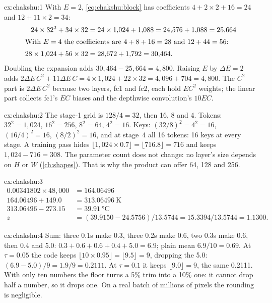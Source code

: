 
\begin{solution}{ex:chakshu:1}
With $E=2$, \cref{eq:chakshu:block} has coefficients $4+2\times2+16=24$ and $12+11\times2=34$:
\begin{align*}
24\times32^2+34\times32 &= 24\times1{,}024+1{,}088 = 24{,}576+1{,}088 = 25{,}664 \\
\intertext{With $E=4$ the coefficients are $4+8+16=28$ and $12+44=56$:}
28\times1{,}024+56\times32 &= 28{,}672+1{,}792 = 30{,}464 .
\end{align*}
Doubling the expansion adds $30{,}464-25{,}664=4{,}800$. Raising $E$ by $\Delta E=2$ adds $2\Delta E\,C^2+11\Delta E\,C
=4\times1{,}024+22\times32=4{,}096+704=4{,}800$. The $C^2$ part is $2\Delta E\,C^2$ because two layers, fc1 and fc2, each
hold $E C^2$ weights; the linear part collects fc1's $EC$ biases and the depthwise convolution's $10EC$.
\end{solution}

\begin{solution}{ex:chakshu:2}
The stage-1 grid is $128/4=32$, then 16, 8 and 4. Tokens: $32^2=1{,}024$, $16^2=256$, $8^2=64$, $4^2=16$. Keys:
$(32/8)^2=4^2=16$, $(16/4)^2=16$, $(8/2)^2=16$, and at stage~4 all 16 tokens: 16 keys at every stage. A training pass
hides $\lfloor1{,}024\times0.7\rfloor=\lfloor716.8\rfloor=716$ and keeps $1{,}024-716=308$. The parameter count does not
change: no layer's size depends on $H$ or $W$ (\cref{ch:shapes}). That is why the product can offer 64, 128 and 256.
\end{solution}

\begin{solution}{ex:chakshu:3}
\begin{align*}
0.00341802\times48{,}000 &= 164.06496\\
164.06496+149.0 &= 313.06496\ \text{K}\\
313.06496-273.15 &= 39.91\ \text{°C}\\
z &= (39.9150-24.5756)/13.5744 = 15.3394/13.5744 = 1.1300 .
\end{align*}
\end{solution}

\begin{solution}{ex:chakshu:4}
Sum: three 0.1s make 0.3, three 0.2s make 0.6, two 0.3s make 0.6, then 0.4 and 5.0:
$0.3+0.6+0.6+0.4+5.0=6.9$; plain mean $6.9/10=0.69$. At $\tau=0.05$ the code keeps
$\lfloor10\times0.95\rfloor=\lfloor9.5\rfloor=9$, dropping the 5.0: $(6.9-5.0)/9=1.9/9=0.2111$. At $\tau=0.1$ it keeps
$\lfloor9.0\rfloor=9$, the same 0.2111. With only ten numbers the floor turns a 5\% trim into a 10\% one: it cannot
drop half a number, so it drops one. On a real batch of millions of pixels the rounding is negligible.
\end{solution}

